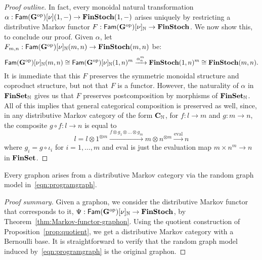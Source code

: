 \begin{proof}[Proof outline]
  In fact, every monoidal natural transformation $\alpha : \mathsf{Fam}(\mathbf{G}^\mathrm{op})[\nu](1,-)
  \to \mathbf{FinStoch}(1,-)$ arises uniquely by restricting a distributive
  Markov functor $F : \mathsf{Fam}(\mathbf{G}^\mathrm{op})[\nu]_{\mathbb{N}} \to \mathbf{FinStoch}$. We now show this, to
  conclude our proof. 
  Given $\alpha$, let $F_{m,n} : \mathsf{Fam}(\mathbf{G}^\mathrm{op})[\nu]_{\mathbb{N}}(m,n) \to \mathbf{FinStoch}(m,n)$ be:%
  \begin{displaymath}
    \mathsf{Fam}(\mathbf{G}^\mathrm{op})[\nu]_{\mathbb{N}}(m,n) \cong \mathsf{Fam}(\mathbf{G}^\mathrm{op})[\nu]_{\mathbb{N}}(1,n)^m \xrightarrow{\alpha_n^m} \mathbf{FinStoch}(1,n)^m \cong \mathbf{FinStoch}(m,n).
  \end{displaymath}
  It is immediate that this $F$ preserves the symmetric monoidal structure and coproduct structure, but not that $F$ is a functor.
  However, the naturality of $\alpha$ in $\mathbf{FinSet}_{\mathbb{N}}$ gives us that $F$ preserves postcomposition by morphisms of $\mathbf{FinSet}_{\mathbb{N}}$.
  All of this implies that general categorical composition is preserved as well, since, in any distributive Markov category of the form $\mathbf{C}_{\mathbb{N}}$, for $f : l \to m$ and $g : m \to n$, the composite $g \circ f : l \to n$ is equal to
  \begin{displaymath}
    l = l \otimes 1^{\otimes m}
    \xrightarrow{f \otimes g_1 \otimes \ldots \otimes g_m}
    m \otimes n^{\otimes m} \xrightarrow{\text{eval}} n
  \end{displaymath}
  where $g_i = g \circ \iota_i$ for $i = 1,\ldots,m$ and $\text{eval}$ is just the evaluation map $m \times n^m \to n$ in $\mathbf{FinSet}$.
\end{proof}

\begin{corollary}\label{corollary:graphon-markov}
  Every graphon arises from a distributive Markov category via the random graph model in~\eqref{eqn:programgraph}.
\end{corollary}
\begin{proof}[Proof summary]
  Given a graphon, we consider the distributive Markov functor that
  corresponds to it, $\Psi : \mathsf{Fam}(\mathbf{G}^\mathrm{op})[\nu]_{\mathbb{N}} \to \mathbf{FinStoch}$, by Theorem~\ref{thm:Markov-functor-graphon}.
  Using the quotient construction of Proposition~\ref{prop:quotient}, we get a distributive Markov category with a Bernoulli base.
  It is straightforward to verify that the random graph model induced by~\eqref{eqn:programgraph} is the original graphon.
\end{proof}

